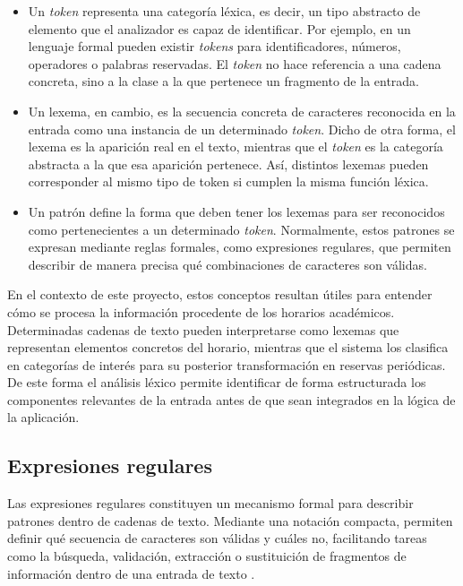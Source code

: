 \begin{itemize}
	\item Un \textit{token} representa una categoría léxica, es decir, un tipo abstracto de elemento que el analizador es capaz de identificar. Por ejemplo, en un lenguaje formal pueden existir \textit{tokens} para identificadores, números, operadores o palabras reservadas. El \textit{token} no hace referencia a una cadena concreta, sino a la clase a la que pertenece un fragmento de la entrada.
	\item Un lexema, en cambio, es la secuencia concreta de caracteres reconocida en la entrada como una instancia de un determinado \textit{token}. Dicho de otra forma, el lexema es la aparición real en el texto, mientras que el \textit{token} es la categoría abstracta a la que esa aparición pertenece. Así, distintos lexemas pueden corresponder al mismo tipo de token si cumplen la misma función léxica.
	\item Un patrón define la forma que deben tener los lexemas para ser reconocidos como pertenecientes a un determinado \textit{token}. Normalmente, estos patrones se expresan mediante reglas formales, como expresiones regulares, que permiten describir de manera precisa qué combinaciones de caracteres son válidas.
\end{itemize}

En el contexto de este proyecto, estos conceptos resultan útiles para entender cómo se procesa la información procedente de los horarios académicos. Determinadas cadenas de texto pueden interpretarse como lexemas que representan elementos concretos del horario, mientras que el sistema los clasifica en categorías de interés para su posterior transformación en reservas periódicas. De este forma el análisis léxico permite identificar de forma estructurada los componentes relevantes de la entrada antes de que sean integrados en la lógica de la aplicación.


\subsection{Expresiones regulares}

Las expresiones regulares constituyen un mecanismo formal para describir patrones dentro de cadenas de texto. Mediante una notación compacta, permiten definir qué secuencia de caracteres son válidas y cuáles no, facilitando tareas como la búsqueda, validación, extracción o sustituición de fragmentos de información dentro de una entrada de texto \cite{regex:david}.

